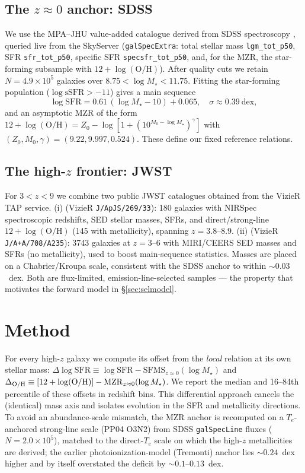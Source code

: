 \documentclass[twocolumn]{aastex631}
\begin{document}
\subsection{The $z\approx0$ anchor: SDSS}
We use the MPA--JHU value-added catalogue derived from SDSS spectroscopy \citep{brinchmann04,tremonti04}, queried live from the SkyServer (\texttt{galSpecExtra}: total stellar mass \texttt{lgm\_tot\_p50}, SFR \texttt{sfr\_tot\_p50}, specific SFR \texttt{specsfr\_tot\_p50}, and, for the MZR, the star-forming subsample with $12+\log(\mathrm{O/H})$). After quality cuts we retain $N=4.9\times10^{5}$ galaxies over $8.75<\log M_\star<11.75$. Fitting the star-forming population ($\log\mathrm{sSFR}>-11$) gives a main sequence
\begin{equation}
\log\mathrm{SFR} = 0.61\,(\log M_\star-10) + 0.065, \quad \sigma\approx0.39~\mathrm{dex},
\end{equation}
and an asymptotic MZR \citep{moustakas11} of the form $12+\log(\mathrm{O/H}) = Z_0-\log[1+(10^{M_0-\log M_\star})^{\gamma}]$ with $(Z_0,M_0,\gamma)=(9.22,9.997,0.524)$. These define our fixed reference relations.

\subsection{The high-$z$ frontier: JWST}
For $3<z<9$ we combine two public JWST catalogues obtained from the VizieR TAP service. (i) \citet{nakajima23} (VizieR \texttt{J/ApJS/269/33}): 180 galaxies with NIRSpec spectroscopic redshifts, SED stellar masses, SFRs, and direct/strong-line $12+\log(\mathrm{O/H})$ (145 with metallicity), spanning $z=3.8$--$8.9$. (ii) \citet{lisiecki25} (VizieR \texttt{J/A+A/708/A235}): 3743 galaxies at $z=3$--$6$ with MIRI/CEERS SED masses and SFRs (no metallicity), used to boost main-sequence statistics. Masses are placed on a Chabrier/Kroupa scale, consistent with the SDSS anchor to within $\sim0.03$~dex. Both are flux-limited, emission-line-selected samples --- the property that motivates the forward model in \S\ref{sec:selmodel}.

\section{Method}
For every high-$z$ galaxy we compute its offset from the \emph{local} relation at its own stellar mass: $\Delta\log\mathrm{SFR}\equiv\log\mathrm{SFR}-\mathrm{SFMS}_{z\approx0}(\log M_\star)$ and $\Delta_{\rm O/H}\equiv[12+\log(\mathrm{O/H})]-\mathrm{MZR}_{z\approx0}(\log M_\star)$. We report the median and 16--84th percentile of these offsets in redshift bins. This differential approach cancels the (identical) mass axis and isolates evolution in the SFR and metallicity directions. To avoid an abundance-scale mismatch, the MZR anchor is recomputed on a $T_e$-anchored strong-line scale (PP04 O3N2) from SDSS \texttt{galSpecLine} fluxes ($N=2.0\times10^{5}$), matched to the direct-$T_e$ scale on which the high-$z$ metallicities are derived; the earlier photoionization-model (Tremonti) anchor lies $\sim0.24$~dex higher and by itself overstated the deficit by $\sim0.1$--$0.13$~dex.
\end{document}
